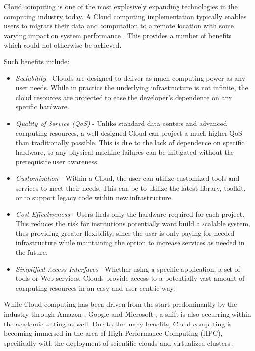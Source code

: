 Cloud computing \cite{Armbrust2010} is one of the most explosively expanding technologies in the computing industry today. A Cloud computing implementation typically enables users to migrate their data and computation to a remote location with some varying impact on system performance \cite{wang2010ngc}.  This provides a number of benefits which could not otherwise be achieved. 

 
Such benefits include:

\begin{itemize}

\item{\em Scalability} - Clouds are designed to deliver as much computing power as any user needs.  While in practice the underlying infrastructure is not infinite, the cloud resources are projected to ease the developer's dependence on any specific hardware.

\item{\em Quality of Service (QoS)} - Unlike standard data centers and advanced computing resources, a well-designed Cloud can project a much higher QoS than traditionally possible.  This is due to the lack of dependence on specific hardware, so any physical machine failures can be mitigated without the prerequisite user awareness.

\item{\em Customization} - Within a Cloud, the user can utilize customized tools and services to meet their needs. This can be to utilize the latest library, toolkit, or to support legacy code within new infrastructure.  

\item{\em Cost Effectiveness} - Users finds only the hardware required for each project.  This reduces the risk for institutions potentially want build a scalable system, thus providing greater flexibility, since the user is only paying for needed infrastructure while maintaining the option to increase services as needed in the future.

\item{\em Simplified Access Interfaces} - Whether using a specific application, a set of tools or Web services, Clouds provide access to a potentially vast amount of computing resources in an easy and user-centric way. 

\end{itemize}

While Cloud computing has been driven from the start predominantly by the industry through Amazon \cite{EC2}, Google \cite{Ciurana2009} and Microsoft \cite{Chappell2009}, a shift is also occurring within the academic setting as well.  Due to the many benefits, Cloud computing is becoming immersed in the area of High Performance Computing (HPC), specifically with the deployment of scientific clouds \cite{Keahey2008} and virtualized clusters \cite{Foster2006}.  


